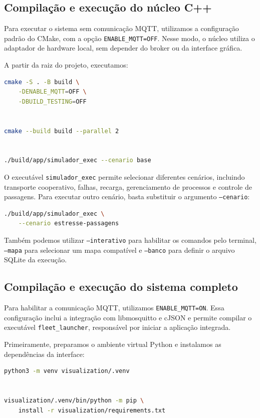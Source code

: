 \documentclass[12pt,a4paper]{article}
\newcommand{\code}[1]{\mbox{\texttt{#1}}}
\begin{document}
\subsection{Compilação e execução do núcleo C++}

Para executar o sistema sem comunicação MQTT, utilizamos a configuração padrão
do CMake, com a opção \code{ENABLE\_MQTT=OFF}. Nesse modo, o núcleo utiliza o
adaptador de hardware local, sem depender do broker ou da interface gráfica.

A partir da raiz do projeto, executamos:

\begin{lstlisting}[basicstyle=\ttfamily\footnotesize, language=bash]
cmake -S . -B build \
    -DENABLE_MQTT=OFF \
    -DBUILD_TESTING=OFF


cmake --build build --parallel 2


./build/app/simulador_exec --cenario base
\end{lstlisting}

O executável \code{simulador\_exec} permite selecionar diferentes cenários,
incluindo transporte cooperativo, falhas, recarga, gerenciamento de processos e
controle de passagens. Para executar outro cenário, basta substituir o
argumento \code{--cenario}:

\begin{lstlisting}[basicstyle=\ttfamily\footnotesize, language=bash]
./build/app/simulador_exec \
    --cenario estresse-passagens
\end{lstlisting}

Também podemos utilizar \code{--interativo} para habilitar os comandos pelo
terminal, \code{--mapa} para selecionar um mapa compatível e \code{--banco}
para definir o arquivo SQLite da execução.

\subsection{Compilação e execução do sistema completo}

Para habilitar a comunicação MQTT, utilizamos \code{ENABLE\_MQTT=ON}. Essa
configuração inclui a integração com libmosquitto e cJSON e permite compilar o
executável \code{fleet\_launcher}, responsável por iniciar a aplicação
integrada.

Primeiramente, preparamos o ambiente virtual Python e instalamos as
dependências da interface:

\begin{lstlisting}[basicstyle=\ttfamily\footnotesize, language=bash]
python3 -m venv visualization/.venv


visualization/.venv/bin/python -m pip \
    install -r visualization/requirements.txt
\end{lstlisting}
\end{document}
